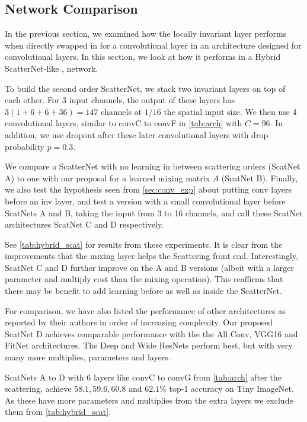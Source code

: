 

\subsection{Network Comparison}\label{sec:scat_exp}
In the previous section, we examined how the locally invariant layer performs when
directly swapped in for a convolutional layer in an architecture designed
for convolutional layers. In this section, we look at how
it performs in a Hybrid ScatterNet-like \cite{oyallon_hybrid_2017,oyallon_scaling_2017},
network.

To build the second order ScatterNet, we stack two invariant layers on top of each
other. For 3 input channels, the output of these layers has $3(1 +
6 + 6 +36) = 147$ channels at $1/16$ the spatial input size. We then use 4
convolutional layers, similar to convC to convF in \autoref{tab:arch} with
$C=96$. In addition, we use dropout after these later convolutional layers with
drop probability $p=0.3$.

We compare a ScatterNet with no learning in between scattering orders
(ScatNet A) to one with our proposal for a learned mixing matrix $A$ (ScatNet B). Finally,
we also test the hypothesis seen from \autoref{sec:conv_exp} about putting conv
layers before an inv layer, and test a version with a small convolutional layer
before ScatNets A and B, taking the input from 3 to 16 channels, and call these ScatNet
architectures ScatNet C and D respectively.

See \autoref{tab:hybrid_scat} for results from these experiments. It is clear from
the improvements that the mixing layer helps the Scattering front end.
Interestingly, ScatNet C and D further improve on the A and B versions
(albeit with a larger parameter and multiply cost than the mixing operation). This reaffirms that there
may be benefit to add learning before as well as inside the ScatterNet.

For comparison, we have also listed the performance of other architectures as
reported by their authors in order of increasing complexity. Our proposed ScatNet D achieves
comparable performance with the the All Conv, VGG16 and FitNet architectures.
The Deep\cite{he_identity_2016} and Wide\cite{zagoruyko_wide_2016}
ResNets perform best, but with very many more
multiplies, parameters and layers.

ScatNets A to D with 6 layers like convC to convG from \autoref{tab:arch} after
the scattering, achieve $58.1, 59.6, 60.8$ and $62.1\%$ top-1 accuracy on Tiny ImageNet. As
these have more parameters and multiplies from the extra layers we exclude them
from \autoref{tab:hybrid_scat}.


